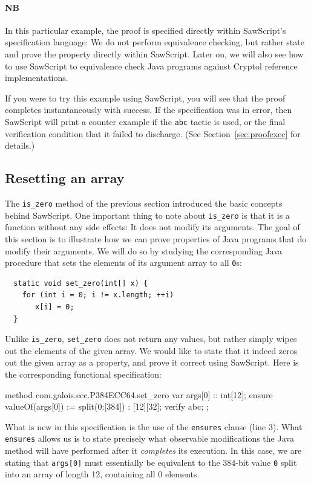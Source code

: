\documentclass[12pt]{galois-whitepaper}
\newcommand{\sawScript}{{\sc SawScript}\xspace}
\begin{document}
\paragraph{NB} In this particular example, the proof is
specified directly within \sawScript's specification language: We do not perform equivalence checking, but rather
state and prove the property directly within \sawScript. Later on, we will also see how to use \sawScript to equivalence check Java programs
against Cryptol reference implementations.

If you were to try this example using \sawScript, you will see that the proof completes instantaneously with success. If the specification was in error, then
\sawScript will print a counter example if the {\tt abc} tactic is used, or the final verification condition that it failed to discharge.
(See Section~\ref{sec:proofexec} for details.)

\subsection{Resetting an array}
The {\tt is\_zero} method of the previous section introduced the basic concepts behind
\sawScript. One important thing to note about {\tt is\_zero} is that it is a function without
any side effects: It does not modify its arguments.
The goal of this
section is to illustrate how we can prove properties of Java programs that do modify their arguments.
We will do so by studying the corresponding Java procedure that sets the elements
of its argument array to all {\tt 0}s:

\begin{Verbatim}
  static void set_zero(int[] x) {
    for (int i = 0; i != x.length; ++i)
       x[i] = 0;
  }
\end{Verbatim}

Unlike {\tt is\_zero}, {\tt set\_zero} does not return any values, but rather simply wipes out the elements of the given array. We would
like to state that it indeed zeros out the given array as a property, and prove it correct using \sawScript. Here is the corresponding functional specification:
\begin{code}[numbers=left]
  method com.galois.ecc.P384ECC64.set_zero {
    var args[0] :: int[12];
    ensure valueOf(args[0]) := split(0:[384]) : [12][32];
    verify abc;
  };
\end{code}
What is new in this specification is the use of the {\tt ensures} clause (line 3). What {\tt ensures} allows us is to state precisely
what observable modifications the Java method will have performed
after it {\em completes} its execution. In this case, we are stating that {\tt args[0]} must essentially be
equivalent to the 384-bit value {\tt 0} split into an array of length 12, containing all 0 elements.
\end{document}
